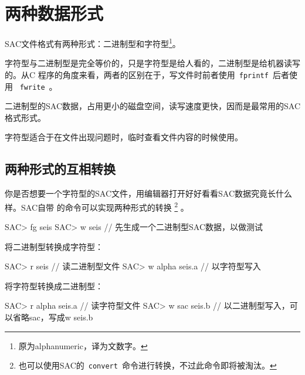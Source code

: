 \section{两种数据形式}
SAC文件格式有两种形式：二进制型和字符型\footnote{原为alphanumeric，译为文数字。}。

字符型与二进制型是完全等价的，只是字符型是给人看的，二进制型是给机器读写的。从C
程序的角度来看，两者的区别在于，写文件时前者使用~\verb+fprintf+~后者使用
~\verb+fwrite+~。

二进制型的SAC数据，占用更小的磁盘空间，读写速度更快，因而是最常用的SAC格式形式。

字符型适合于在文件出现问题时，临时查看文件内容的时候使用。

\subsection{两种形式的互相转换}
你是否想要一个字符型的SAC文件，用编辑器打开好好看看SAC数据究竟长什么样。SAC自带
的命令可以实现两种形式的转换
\footnote{也可以使用SAC的~\verb+convert+~命令进行转换，不过此命令即将被淘汰。}
。
\begin{SACCode}
SAC> fg seis
SAC> w seis             // 先生成一个二进制型SAC数据，以做测试
\end{SACCode}

将二进制型转换成字符型：
\begin{SACCode}
SAC> r seis             // 读二进制型文件
SAC> w alpha seis.a     // 以字符型写入
\end{SACCode}

将字符型转换成二进制型：
\begin{SACCode}
SAC> r alpha seis.a     // 读字符型文件
SAC> w sac seis.b       // 以二进制型写入，可以省略sac，写成w seis.b
\end{SACCode}

